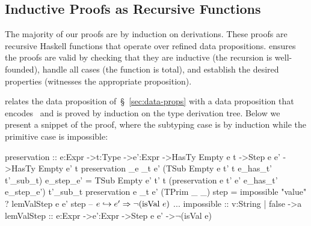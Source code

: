 %
%
%
%


\subsection{Inductive Proofs as Recursive Functions}
\label{impl:proofs}

The majority of our proofs are by induction on derivations.
These proofs are recursive Haskell functions that
operate over refined data propositions. 
\lh ensures the proofs are valid by checking that
they are inductive (\ie the recursion is well-founded),
handle all cases (\ie the function is total), and
establish the desired properties 
(\ie witnesses the appropriate proposition).

relates the  data proposition of~\S~\ref{sec:data-props}
with a  data proposition that encodes~
and is proved by induction on the type derivation tree.
Below we present a snippet of the proof, where 
the subtyping case is by induction
while the primitive case is impossible: 
%
\begin{mcode}
  preservation :: e:Expr ->t:Type ->e':Expr ->HasTy Empty e t 
               ->Step e e' ->HasTy Empty e' t
  preservation _e _t e' (TSub Empty e t' t e_has_t' t'_sub_t) e_step_e'
    = TSub Empty e' t' t (preservation e t' e' e_has_t' e_step_e') t'_sub_t
  preservation  e _t e' (TPrim _ _) step
    = impossible "value" ? lemValStep e e' step -- $e \step e' \Rightarrow \neg (\text{isVal}\ e)$
  ...
  impossible :: {v:String | false} ->a
  lemValStep :: e:Expr ->e':Expr ->Step e e' ->{$\neg$(isVal e)}
\end{mcode}

